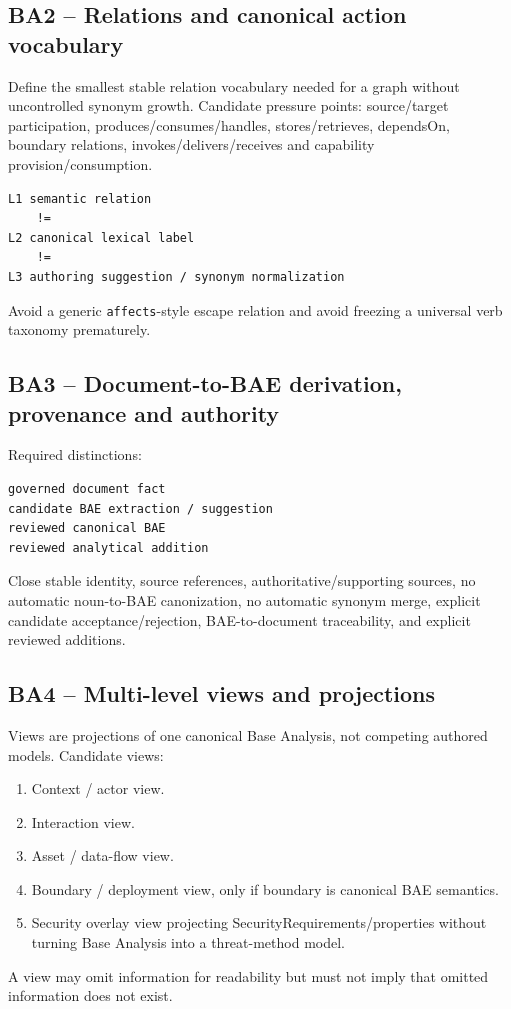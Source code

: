 \documentclass[11pt,a4paper]{article}
\begin{document}
\subsection{BA2 -- Relations and canonical action vocabulary}
Define the smallest stable relation vocabulary needed for a graph without uncontrolled synonym growth. Candidate pressure points: source/target participation, produces/consumes/handles, stores/retrieves, dependsOn, boundary relations, invokes/delivers/receives and capability provision/consumption.
\begin{lstlisting}
L1 semantic relation
    !=
L2 canonical lexical label
    !=
L3 authoring suggestion / synonym normalization
\end{lstlisting}
Avoid a generic \texttt{affects}-style escape relation and avoid freezing a universal verb taxonomy prematurely.

\subsection{BA3 -- Document-to-BAE derivation, provenance and authority}
Required distinctions:
\begin{lstlisting}
governed document fact
candidate BAE extraction / suggestion
reviewed canonical BAE
reviewed analytical addition
\end{lstlisting}
Close stable identity, source references, authoritative/supporting sources, no automatic noun-to-BAE canonization, no automatic synonym merge, explicit candidate acceptance/rejection, BAE-to-document traceability, and explicit reviewed additions.

\subsection{BA4 -- Multi-level views and projections}
Views are projections of one canonical Base Analysis, not competing authored models. Candidate views:
\begin{enumerate}
\item Context / actor view.
\item Interaction view.
\item Asset / data-flow view.
\item Boundary / deployment view, only if boundary is canonical BAE semantics.
\item Security overlay view projecting SecurityRequirements/properties without turning Base Analysis into a threat-method model.
\end{enumerate}
A view may omit information for readability but must not imply that omitted information does not exist.
\end{document}
